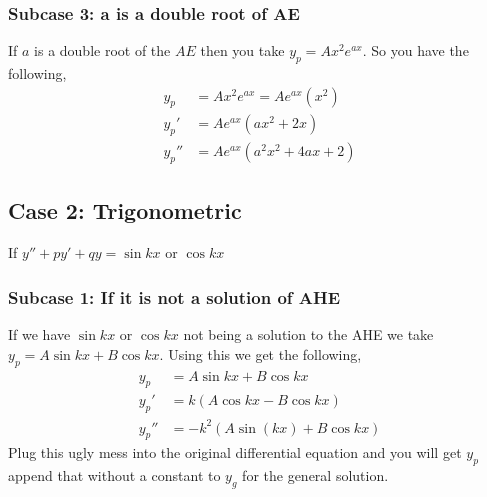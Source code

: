 \documentclass[oneside,11pt,pdftex,final]{book}%
\numberwithin{equation}{section}
\newtheorem{example}[theorem]{Example}
\numberwithin{section}{chapter}
\numberwithin{equation}{chapter}
\begin{document}
\subsubsection{Subcase 3: a is a double root of AE}
If $ a $ is a double root of the $ AE $ then you take $ y_p=Ax^2e^{ax} $. So you have the following,
\begin{align*}
	y_p&=Ax^2e^{ax}=Ae^{ax}(x^2)\\
	y_p'&=Ae^{ax} (ax^2+2x)\\
	y_p''&=Ae^{ax}(a^2x^2+4ax+2)
\end{align*}


%

\subsection{Case 2: Trigonometric}
If $ y''+py'+qy=\sin kx $ or $ \cos kx $
\subsubsection{Subcase 1: If it is not a solution of AHE}
If we have $ \sin kx  $  or $ \cos kx  $ not being a solution to the AHE we take $ y_p=A \sin kx + B \cos kx $. Using this we get the following,
\begin{align*}
	y_p&=A \sin kx + B \cos kx\\
	y_p'&=k(A \cos kx - B \cos kx)\\
	y_p''&=-k^2(A \sin (kx)+B \cos kx)
\end{align*}
Plug this ugly mess into the original differential equation and you will get $ y_p $ append that without a constant to $ y_g $ for the general solution.
\end{document}
